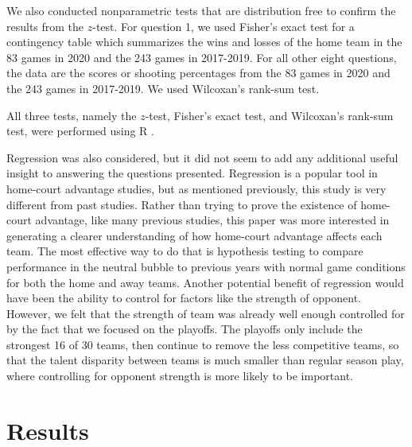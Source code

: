\documentclass[10pt]{article}
\begin{document}
We also conducted nonparametric tests that are distribution free to
confirm the results from the \(z\)-test. For question 1, we used
Fisher's exact test for a contingency table which summarizes the wins
and losses of the home team in the 83 games in 2020 and the 243 games
in 2017-2019. For all other eight questions, the data are the scores
or shooting percentages from the 83 games in 2020 and the 243 games in
2017-2019. We used Wilcoxan's rank-sum test.

All three tests, namely the \(z\)-test, Fisher's exact test, and
Wilcoxan's rank-sum test, were performed using R \citep{R}.

Regression was also considered, but it did not seem to add any additional 
useful insight to answering the questions presented. Regression is a popular
tool in home-court advantage studies, but as mentioned previously, this
study is very different from past studies. Rather than trying to prove the
existence of home-court advantage, like many previous studies, this paper
was more interested in generating a clearer understanding of how home-court
advantage affects each team. The most effective way to do that is hypothesis
testing to compare performance in the neutral bubble to previous years with
normal game conditions for both the home and away teams. Another potential
benefit of regression would have been the ability to control for factors
like the strength of opponent. However, we felt that the strength of team was
already well enough controlled for by the fact that we focused on the
playoffs. The playoffs only include the strongest 16 of 30 teams, then
continue to remove the less competitive teams, so that the talent disparity
between teams is much smaller than regular season play, where controlling for
opponent strength is more likely to be important.

\section{Results}
\end{document}
